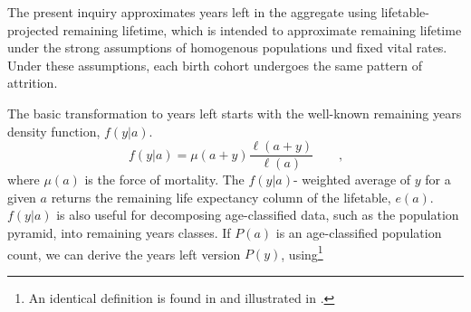 \documentclass[12pt,oneside,a4paper,leqno]{article}
\newcommand{\ec}{\quad\quad\text{,}}
\begin{document}
The present inquiry approximates years left in the aggregate using
lifetable-projected remaining lifetime, which is intended to approximate remaining lifetime under the strong
assumptions of homogenous populations und fixed vital rates. 
Under these assumptions, each birth cohort undergoes the same
pattern of attrition. %

The basic transformation to years left starts with the well-known remaining
years density function, $f(y|a)$.
\begin{equation}
\label{eq:vaupel1}
f(y | a) = \mu(a+y)\frac{\ell(a+y)}{\ell(a)} \ec
\end{equation}
where $\mu(a)$ is the force of mortality.
The $f(y|a)$- weighted average of $y$ for a given $a$ returns the remaining life
expectancy column of the lifetable, $e(a)$. $f(y|a)$ is also useful for
decomposing age-classified data, such as the
population pyramid, into remaining years classes. If $P(a)$ is an
age-classified population count, we can derive the years left version $P(y)$,
using\footnote{An identical definition is found in
\citet{brouard1989mouvements} and illustrated in \citet{brouard1986structure}.}
\end{document}
